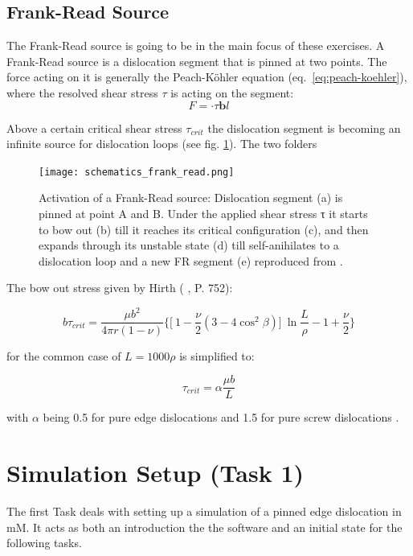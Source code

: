 \FloatBarrier
\subsection{Frank-Read Source}

The Frank-Read source is going to be in the main focus of these exercises. A Frank-Read source is a dislocation segment that is pinned at two points. The force acting on it is generally the Peach-Köhler equation (eq.~\ref{eq:peach-koehler}), where the resolved shear stress \(\tau\) is acting on the segment:
\begin{equation}
	F =  \cdot \tau \mathbf{b}l
\end{equation} 

Above a certain critical shear stress \(\tau_{crit}\) the dislocation segment is becoming an infinite source for dislocation loops (see fig. \ref{fig:frank-read-scheme}). The two folders 

\begin{figure}[htb]
	\centering
	\texttt{[image: schematics\_frank\_read.png]}
	\caption{ Activation of a Frank-Read source: Dislocation segment (a) is pinned at point A
		and B. Under the applied shear stress τ it starts to bow out (b) till it reaches
		its critical configuration (c), and then expands through its unstable state (d) till
		self-anihilates to a dislocation loop and a new FR segment (e) reproduced from \cite{zaiser}.}
	\label{fig:frank-read-scheme}
\end{figure}

The bow out stress given by Hirth ( \cite{anderson2017}, P. 752):

\begin{equation}
	b\tau_{crit} = \frac{\mu b^{2}}{4\pi r(1-\nu)} \biggl\{ \biggl[\ 1- \frac{\nu}{2}(3-4\cos^{2}\beta) \biggr]\ \ln \frac{L}{\rho} -1 + \frac{\nu}{2} \biggr\} \label{eq:tau_crit}
\end{equation}

for the common case of \( L =1000\rho \) is simplified to: 

\begin{equation}
	\tau_{crit} = \alpha \frac{\mu b}{L}
\end{equation}

with \(\alpha\) being 0.5 for pure edge dislocations and 1.5 for pure screw dislocations \cite{zaiser}. 

\section{Simulation Setup (Task 1)}
The first Task deals with setting up a simulation of a pinned edge dislocation in mM. It acts as both an introduction the the software and an initial state for the following tasks.

